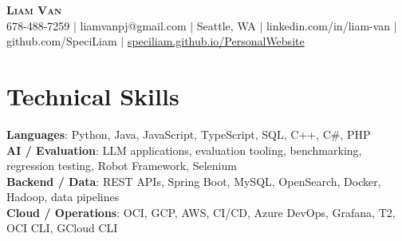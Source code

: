 \documentclass[letterpaper,11pt]{article}
\begin{document}

%
\begin{center}
    \textbf{\Huge \scshape Liam Van} \\ \vspace{1pt}
    \small 678-488-7259 $|$ \small {liamvanpj@gmail.com} $|$ Seattle, WA
 {{$|$ linkedin.com/in/liam-van} {$|$ github.com/SpeciLiam} {$|$ \href{https://speciliam.github.io/PersonalWebsite}{speciliam.github.io/PersonalWebsite}}}

\end{center}

\section{Technical Skills}
 \begin{itemize}[leftmargin=0.15in, label={}]
    \small{\item{
     \textbf{Languages}{: Python, Java, JavaScript, TypeScript, SQL, C++, C\#, PHP} \\
     \textbf{AI / Evaluation}{: LLM applications, evaluation tooling, benchmarking, regression testing, Robot Framework, Selenium} \\
     \textbf{Backend / Data}{: REST APIs, Spring Boot, MySQL, OpenSearch, Docker, Hadoop, data pipelines} \\
     \textbf{Cloud / Operations}{: OCI, GCP, AWS, CI/CD, Azure DevOps, Grafana, T2, OCI CLI, GCloud CLI} \\
    }}
 \end{itemize}
%
\end{document}
